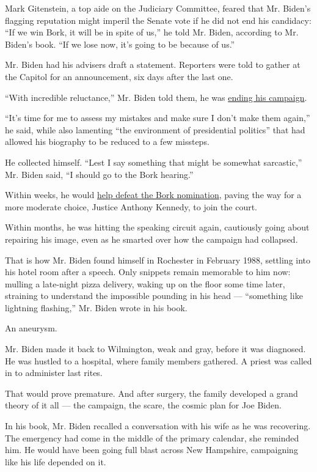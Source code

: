 Mark Gitenstein, a top aide on the Judiciary Committee, feared that Mr.
Biden's flagging reputation might imperil the Senate vote if he did not
end his candidacy: ``If we win Bork, it will be in spite of us,'' he
told Mr. Biden, according to Mr. Biden's book. ``If we lose now, it's
going to be because of us.''

Mr. Biden had his advisers draft a statement. Reporters were told to
gather at the Capitol for an announcement, six days after the last one.

``With incredible reluctance,'' Mr. Biden told them, he was
\href{https://www.nytimes3xbfgragh.onion/1987/09/24/us/biden-withdraws-bid-for-president-in-wake-of-furor.html}{ending
his campaign}.

``It's time for me to assess my mistakes and make sure I don't make them
again,'' he said, while also lamenting ``the environment of presidential
politics'' that had allowed his biography to be reduced to a few
missteps.

He collected himself. ``Lest I say something that might be somewhat
sarcastic,'' Mr. Biden said, ``I should go to the Bork hearing.''

Within weeks, he would
\href{https://www.nytimes3xbfgragh.onion/1987/10/24/politics/borks-nomination-is-rejected-5842-reagan-saddened.html}{help
defeat the Bork nomination}, paving the way for a more moderate choice,
Justice Anthony Kennedy, to join the court.

Within months, he was hitting the speaking circuit again, cautiously
going about repairing his image, even as he smarted over how the
campaign had collapsed.

That is how Mr. Biden found himself in Rochester in February 1988,
settling into his hotel room after a speech. Only snippets remain
memorable to him now: mulling a late-night pizza delivery, waking up on
the floor some time later, straining to understand the impossible
pounding in his head --- ``something like lightning flashing,'' Mr.
Biden wrote in his book.

An aneurysm.

Mr. Biden made it back to Wilmington, weak and gray, before it was
diagnosed. He was hustled to a hospital, where family members gathered.
A priest was called in to administer last rites.

That would prove premature. And after surgery, the family developed a
grand theory of it all --- the campaign, the scare, the cosmic plan for
Joe Biden.

In his book, Mr. Biden recalled a conversation with his wife as he was
recovering. The emergency had come in the middle of the primary
calendar, she reminded him. He would have been going full blast across
New Hampshire, campaigning like his life depended on it.


